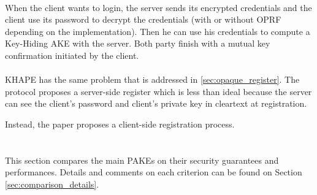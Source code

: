 \documentclass[../report.tex]{subfiles}
\begin{document}
\paragraph{}

When the client wants to login, the server sends its encrypted credentials and the client use its password to decrypt the credentials (with or without OPRF depending on the implementation). Then he can use his credentials to compute a Key-Hiding AKE with the server.
Both party finish with a mutual key confirmation initiated by the client.


\paragraph{}
KHAPE has the same problem that is addressed in \ref{sec:opaque_register}.
The protocol proposes a server-side register which is less than ideal because the server can see the client’s password and client's private key in cleartext at registration.

Instead, the paper proposes a client-side registration process.






\section{}

This section compares the main PAKEs on their security guarantees and performances. Details and comments on each criterion can be found on Section \ref{sec:comparison_details}.
\end{document}
